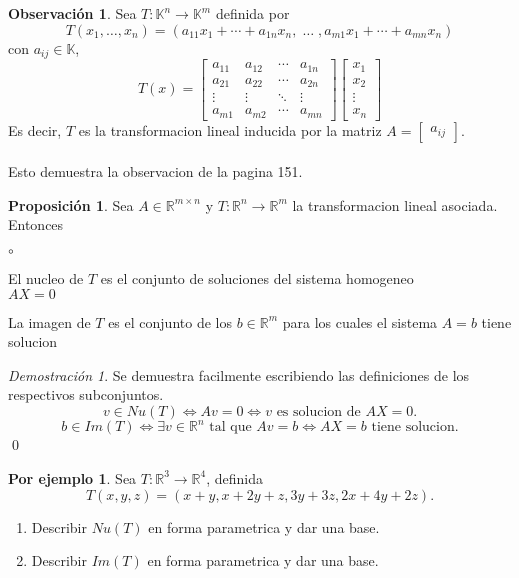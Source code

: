 \documentclass{article}
\theoremstyle{definition}
\theoremstyle{definition}
\newtheorem*{obs}{Observación}
\newtheorem{prop}[teo]{Proposición}
\newtheorem*{ej}{Por ejemplo}
\theoremstyle{remark}
\newtheorem*{demo}{Demostración}
\begin{document}
\begin{obs}
  Sea $T : \mathbb{K}^n \to \mathbb{K}^m$ definida por \[
    T(x_1, \dots ,x_n)=(a_{11}x_1+\cdots + a_{1n}x_n , \; \dots \; , a_{m1}x_1+\cdots +a_{mn}x_n)
  \]
  con $a_{ij}\in \mathbb{K}$, \[
    T(x)=\begin{bmatrix}a_{11} & a_{12} & \cdots & a_{1n} \\ a_{21 } & a_{22} & \cdots &a_{2n} \\ \vdots & \vdots & \ddots & \vdots \\ a_{m1} & a_{m2} & \cdots & a_{mn} \end{bmatrix} \begin{bmatrix}x_1 \\ x_2 \\ \vdots \\ x_n \end{bmatrix}
  \]
  Es decir, $T$ es la transformacion lineal inducida por la matriz $A=\begin{bmatrix}a_{ij}\end{bmatrix}$. \\\\ Esto demuestra la observacion de la pagina 151.
\end{obs}
\begin{prop}
  Sea $A \in \mathbb{R}^{m \times n}$ y $T : \mathbb{R}^n \to \mathbb{R}^m$ la transformacion lineal asociada. Entonces 
\begin{list}{$\circ$}{}  
\item  El nucleo de $T$ es el conjunto de soluciones del sistema homogeneo \\ $AX=0$
\item La imagen de $T$ es el conjunto de los $b \in \mathbb{R}^m$ para los cuales el sistema $A=b$ tiene solucion
\end{list}
\end{prop}
\begin{demo}
  Se demuestra facilmente escribiendo las definiciones de los respectivos subconjuntos. \[
    v \in Nu(T) \Leftrightarrow Av=0 \Leftrightarrow v \text{ es solucion de }AX = 0.
  \]
  \[
    b \in Im(T) \Leftrightarrow \exists v \in \mathbb{R}^n \text{ tal que }Av=b \Leftrightarrow AX=b \text{ tiene solucion.}
  \]
  \qed
\end{demo}
\begin{ej}
 Sea $T : \mathbb{R}^3 \to \mathbb{R}^4$, definida \[
   T(x,y,z)=(x+y,x+2y+z,3y+3z,2x+4y+2z).
 \]
 \begin{enumerate}[label=(\arabic*)]
   \item Describir $Nu(T)$ en forma parametrica y dar una base. 
   \item Describir $Im(T)$ en forma parametrica y dar una base.
 \end{enumerate}
\end{ej}
\end{document}
